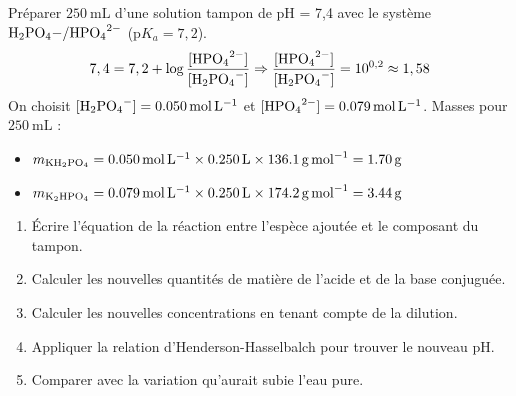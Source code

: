 \begin{exemple}
Préparer $\SI{250}{\mL}$ d'une solution tampon de pH = 7,4 avec le système $\ce{H2PO4-/HPO4^2-}$ ($\mathrm{p}K_a = 7,2$).
\[7,4 = 7,2 + \log\frac{[\ce{HPO4^2-}]}{[\ce{H2PO4-}]} \Rightarrow \frac{[\ce{HPO4^2-}]}{[\ce{H2PO4-}]} = 10^{0,2} \approx 1,58\]
On choisit $[\ce{H2PO4-}] = \SI{0,050}{\mol\per\litre}$ et $[\ce{HPO4^2-}] = \SI{0,079}{\mol\per\litre}$.
Masses pour $\SI{250}{\mL}$ :
\begin{itemize}
    \item $m_{\ce{KH2PO4}} = \SI{0,050}{\mol\per\litre} \times \SI{0,250}{\L} \times \SI{136,1}{\gram\per\mol} = \SI{1,70}{\gram}$
    \item $m_{\ce{K2HPO4}} = \SI{0,079}{\mol\per\litre} \times \SI{0,250}{\L} \times \SI{174,2}{\gram\per\mol} = \SI{3,44}{\gram}$
\end{itemize}
\end{exemple}

\begin{enumerate}
    \item Écrire l'équation de la réaction entre l'espèce ajoutée et le composant du tampon.
    \item Calculer les nouvelles quantités de matière de l'acide et de la base conjuguée.
    \item Calculer les nouvelles concentrations en tenant compte de la dilution.
    \item Appliquer la relation d'Henderson-Hasselbalch pour trouver le nouveau pH.
    \item Comparer avec la variation qu'aurait subie l'eau pure.
\end{enumerate}

